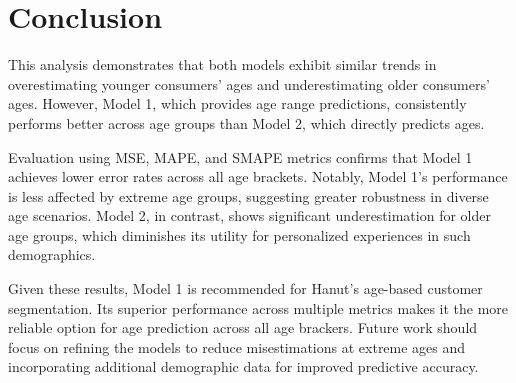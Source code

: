\documentclass{article}
\begin{document}
\section{Conclusion}
This analysis demonstrates that both models exhibit similar trends in overestimating younger consumers' ages and underestimating older consumers' ages. However, Model 1, which provides age range predictions, consistently performs better across age groups than Model 2, which directly predicts ages.

Evaluation using MSE, MAPE, and SMAPE metrics confirms that Model 1 achieves lower error rates across all age brackets. Notably, Model 1's performance is less affected by extreme age groups, suggesting greater robustness in diverse age scenarios. Model 2, in contrast, shows significant underestimation for older age groups, which diminishes its utility for personalized experiences in such demographics.

Given these results, Model 1 is recommended for Hanut's age-based customer segmentation. Its superior performance across multiple metrics makes it the more reliable option for age prediction across all age brackers. Future work should focus on refining the models to reduce misestimations at extreme ages and incorporating additional demographic data for improved predictive accuracy.
\end{document}
